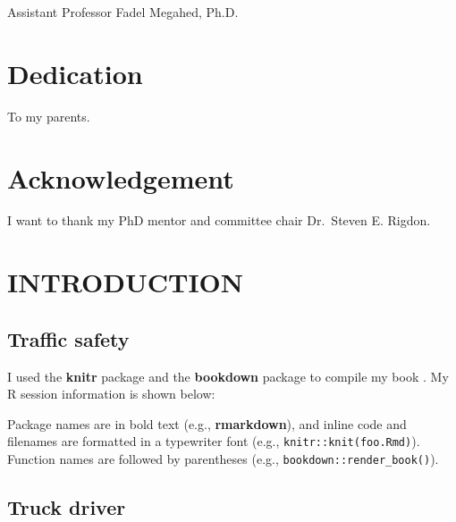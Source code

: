 \documentclass[12pt]{book}
\numberwithin{equation}{chapter}
\begin{document}
\vspace{.3cm}
Assistant Professor Fadel Megahed, Ph.D.
\vspace*{\fill}








\hypertarget{dedication}{%
\chapter*{Dedication}\label{dedication}}

To my parents.

\hypertarget{acknowledgement}{%
\chapter*{Acknowledgement}\label{acknowledgement}}

I want to thank my PhD mentor and committee chair Dr.~Steven E. Rigdon.

\cleardoublepage
\tableofcontents

\listoffigures
\listoftables

\mainmatter

\hypertarget{introduction}{%
\chapter{INTRODUCTION}\label{introduction}}

\hypertarget{traffic-safety}{%
\section{Traffic safety}\label{traffic-safety}}

I used the \textbf{knitr} package and the \textbf{bookdown} package to compile my book \citep{xie2014, R-bookdown}. My R session information is shown below:

Package names are in bold text (e.g., \textbf{rmarkdown}), and inline code and filenames are formatted in a typewriter font (e.g., \texttt{knitr::knit(\textquotesingle{}foo.Rmd\textquotesingle{})}). Function names are followed by parentheses (e.g., \texttt{bookdown::render\_book()}).

\hypertarget{truck-driver}{%
\section{Truck driver}\label{truck-driver}}
\end{document}
